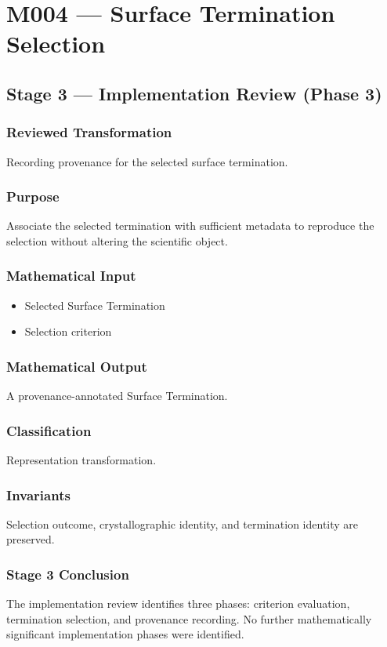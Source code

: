 \chapter{M004 --- Surface Termination Selection}

\section{Stage 3 --- Implementation Review (Phase 3)}

\subsection{Reviewed Transformation}

Recording provenance for the selected surface termination.

\subsection{Purpose}

Associate the selected termination with sufficient metadata to reproduce
the selection without altering the scientific object.

\subsection{Mathematical Input}

\begin{itemize}
\item Selected Surface Termination
\item Selection criterion
\end{itemize}

\subsection{Mathematical Output}

A provenance-annotated Surface Termination.

\subsection{Classification}

Representation transformation.

\subsection{Invariants}

Selection outcome, crystallographic identity, and termination identity
are preserved.

\subsection{Stage 3 Conclusion}

The implementation review identifies three phases:
criterion evaluation, termination selection, and provenance recording.
No further mathematically significant implementation phases were
identified.

